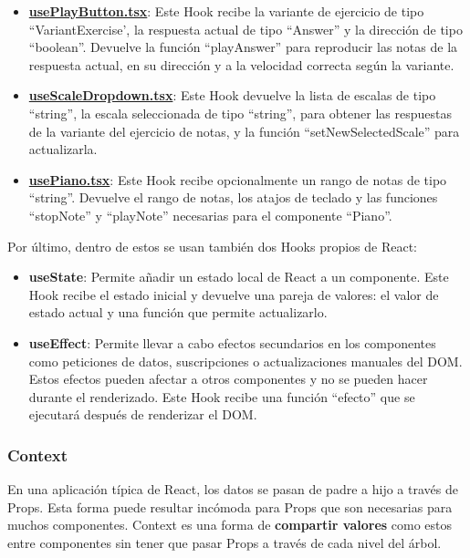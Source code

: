 \documentclass[12pt,twoside,titlepage]{report}
\begin{document}
\begin{itemize}
    \item \href{https://github.com/alberttogoca/EarFit/blob/main/src/hooks/usePlayButton.tsx}{\textbf{usePlayButton.tsx}}: Este Hook recibe la variante de ejercicio de tipo ``VariantExercise', la respuesta actual de tipo ``Answer'' y la dirección de tipo ``boolean''. Devuelve la función ``playAnswer'' para reproducir las notas de la respuesta actual, en su dirección y a la velocidad correcta según la variante.
    \item \href{https://github.com/alberttogoca/EarFit/blob/main/src/hooks/useScaleDropdown.tsx}{\textbf{useScaleDropdown.tsx}}: Este Hook devuelve la lista de escalas de tipo ``string\text{[]}'', la escala seleccionada de tipo ``string'', para obtener las respuestas de la variante del ejercicio de notas, y la función ``setNewSelectedScale'' para actualizarla.
    \item \href{https://github.com/alberttogoca/EarFit/blob/main/src/hooks/usePiano.tsx}{\textbf{usePiano.tsx}}: Este Hook recibe opcionalmente un rango de notas de tipo ``string''. Devuelve el rango de notas, los atajos de teclado y las funciones ``stopNote'' y ``playNote'' necesarias para el componente ``Piano''.
\end{itemize}

Por último, dentro de estos se usan también dos Hooks propios de React:
\begin{itemize}
 \item \textbf{useState}: Permite añadir un estado local de React a un componente. Este Hook recibe el estado inicial y devuelve una pareja de valores: el valor de estado actual y una función que permite actualizarlo. \cite{useState}
 \item \textbf{useEffect}: Permite llevar a cabo efectos secundarios en los componentes como peticiones de datos, suscripciones o actualizaciones manuales del DOM. Estos efectos pueden afectar a otros componentes y no se pueden hacer durante el renderizado. Este Hook recibe una función ``efecto'' que se ejecutará después de renderizar el DOM. \cite{useEffect} 
\end{itemize}

\subsubsection{Context}

En una aplicación típica de React, los datos se pasan de padre a hijo a través de Props. Esta forma puede resultar incómoda para Props que son necesarias para muchos componentes. Context es una forma de \textbf{compartir valores} como estos entre componentes sin tener que pasar Props a través de cada nivel del árbol.
\cite{context1}
\end{document}
